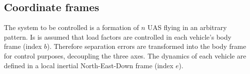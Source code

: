 \documentclass{ifacconf}
\begin{document}
\subsection{Coordinate frames}
The system to be controlled is a formation of $n$ UAS flying in an arbitrary pattern. Is is assumed that
load factors are controlled in each vehicle's body frame (index $b$). Therefore separation errors are transformed into the body frame for control purposes, decoupling the three axes. The dynamics of each vehicle are defined in a local inertial North-East-Down frame (index $e$). 



\end{document}
